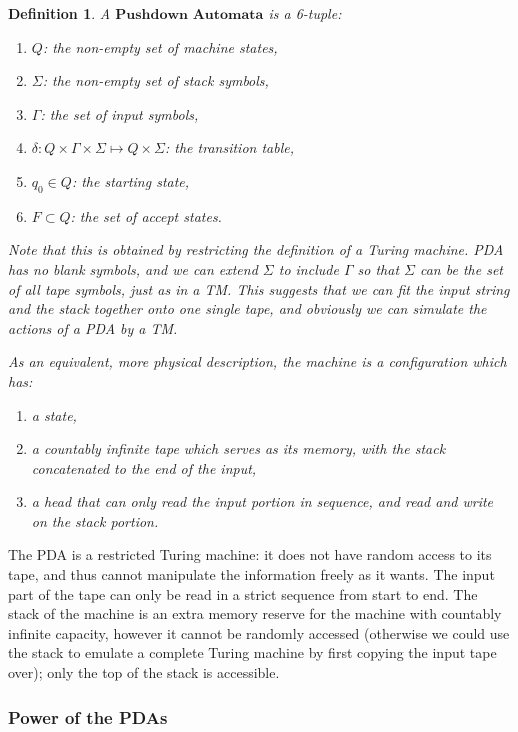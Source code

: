 \documentclass[12pt]{article}  %
\newtheorem{definition}{Definition}
\begin{document}
\begin{definition}
A $\textbf{Pushdown Automata}$ is a 6-tuple:
\begin{enumerate}
	\item $Q$: the non-empty set of machine states,
	\item $\Sigma$: the non-empty set of stack symbols,
	\item $\Gamma$: the set of input symbols,
	\item $\delta: Q \times \Gamma \times \Sigma \mapsto Q \times \Sigma $: the transition table,
	\item $q_0 \in Q$: the starting state,
	\item $F \subset Q$: the set of accept states.
\end{enumerate}

Note that this is obtained by restricting the definition of a Turing machine. PDA has no blank symbols, and we can extend $\Sigma$ to include $\Gamma$ so that $\Sigma$ can be the set of all tape symbols, just as in a TM. This suggests that we can fit the input string and the stack together onto one single tape, and obviously we can simulate the actions of a PDA by a TM.

As an equivalent, more physical description, the machine is a configuration which has:
\begin{enumerate}
	\item a state,
	\item a countably infinite tape which serves as its memory, with the stack concatenated to the end of the input,
	\item a head that can only read the input portion in sequence, and read and write on the stack portion.
\end{enumerate}
\end{definition}



The PDA is a restricted Turing machine: it does not have random access to its tape, and thus cannot manipulate the information freely as it wants. The input part of the tape can only be read in a strict sequence from start to end. The stack of the machine is an extra memory reserve for the machine with countably infinite capacity, however it cannot be randomly accessed (otherwise we could use the stack to emulate a complete Turing machine by first copying the input tape over); only the top of the stack is accessible.




\subsubsection{Power of the PDAs}
\end{document}
